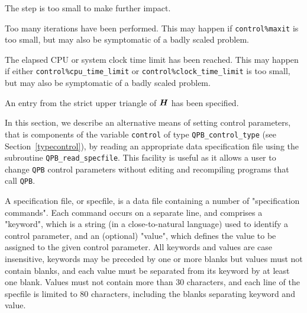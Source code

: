 \documentclass{galahad}
\newcommand{\packagename}{QPB}
\begin{document}
\begin{description}
 The step is too small to make further impact.

 Too many iterations have been performed. 
  This may happen if
    {\tt control\%maxit} is too small, but may also be symptomatic of 
    a badly scaled problem.

 The elapsed CPU or system clock time limit has been 
    reached. This may happen if either {\tt control\%cpu\_time\_limit} or
    {\tt control\%clock\_time\_limit} is too small, but may also be symptomatic 
    of a badly scaled problem.

 An entry from the strict upper triangle of ${\bm{H}}$ 
 has been specified.

\end{description}


\galfeatures
\noindent In this section, we describe an alternative means of setting 
control parameters, that is components of the variable {\tt control} of type
{\tt \packagename\_control\_type}
(see Section~\ref{typecontrol}), 
by reading an appropriate data specification file using the
subroutine {\tt \packagename\_read\_specfile}. This facility
is useful as it allows a user to change  {\tt \packagename} control parameters 
without editing and recompiling programs that call {\tt \packagename}.

A specification file, or specfile, is a data file containing a number of 
"specification commands". Each command occurs on a separate line, 
and comprises a "keyword", 
which is a string (in a close-to-natural language) used to identify a 
control parameter, and 
an (optional) "value", which defines the value to be assigned to the given
control parameter. All keywords and values are case insensitive, 
keywords may be preceded by one or more blanks but
values must not contain blanks, and
each value must be separated from its keyword by at least one blank.
Values must not contain more than 30 characters, and 
each line of the specfile is limited to 80 characters,
including the blanks separating keyword and value.
\end{document}
